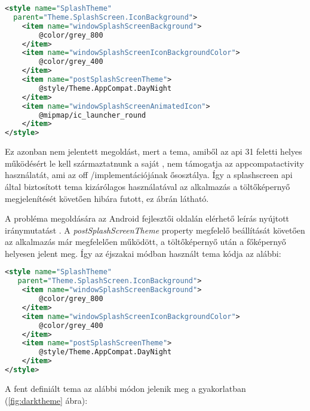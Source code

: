 \begin{lstlisting}[frame=single,language=xml,emph={style,item},
    emphstyle=\color{BurntOrange}\textbf,stringstyle=\color{OliveGreen}\textbf]
<style name="SplashTheme"
  parent="Theme.SplashScreen.IconBackground">
    <item name="windowSplashScreenBackground">
        @color/grey_800
    </item>
    <item name="windowSplashScreenIconBackgroundColor">
        @color/grey_400
    </item>
    <item name="postSplashScreenTheme">
        @style/Theme.AppCompat.DayNight
    </item>
    <item name="windowSplashScreenAnimatedIcon">
        @mipmap/ic_launcher_round
    </item>
</style>
\end{lstlisting}

Ez azonban nem jelentett megoldást, mert a \gls{tema}, amiből az \acrshort{api} 31 feletti helyes működésért
le kell származtatnunk a saját , nem támogatja az \gls{appcompat}\gls{activity} használatát, ami
az \acrlong{off} \-/implementációjának ősosztálya. Így a \gls{splashscreen} \acrshort{api} által biztosított
\gls{tema} kizárólagos használatával az alkalmazás a töltőképernyő megjelenítését követően hibára futott,
ez \az{\ref{fig:appcompatcrash}} ábrán látható.

A probléma megoldására az Android fejlesztői oldalán elérhető leírás
nyújtott iránymutatást \cite{splashscreenmigration}. A \textit{postSplashScreenTheme} property megfelelő beállítását követően
az alkalmazás már megfelelően működött, a töltőképernyő után a főképernyő helyesen jelent meg.
Így az éjszakai módban használt \gls{tema} kódja az alábbi:

\begin{lstlisting}[frame=single,language=xml,emph={style,item},
    emphstyle=\color{BurntOrange}\textbf,stringstyle=\color{OliveGreen}\textbf]
 <style name="SplashTheme"
   parent="Theme.SplashScreen.IconBackground">
    <item name="windowSplashScreenBackground">
        @color/grey_800
    </item>
    <item name="windowSplashScreenIconBackgroundColor">
        @color/grey_400
    </item>
    <item name="postSplashScreenTheme">
        @style/Theme.AppCompat.DayNight
    </item>
</style>
\end{lstlisting}

A fent definiált \gls{tema} az alábbi módon jelenik meg a gyakorlatban (\ref{fig:darktheme} ábra):


